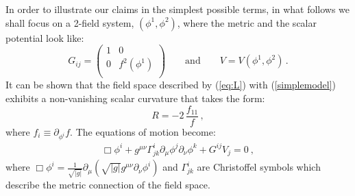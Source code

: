 \documentclass[a4paper,11pt]{article}
\def\be{\begin{equation}}
\def\ee{\end{equation}}
\begin{document}
In order to illustrate our claims in the simplest possible terms, in what follows we shall focus on a 2-field system, $(\phi^1,\phi^2)$, where the metric and the scalar potential look like:
\be
G_{ij}= \left(
  \begin{array}{cc}
   1 & 0  \\
0 & f^2(\phi^1) \\
  \end{array} \right)\qquad \text{and} \qquad V = V(\phi^1,\phi^2) \,.
	\label{simplemodel}
\ee
It can be shown that the field space described by (\ref{eq:L}) with (\ref{simplemodel}) exhibits a non-vanishing scalar curvature that takes the form:
\be
R=-2 \,\frac{f_{11}}{f}\,,
\label{eq:R}
\ee
where $f_i\equiv \partial_{\phi^i} f$. The equations of motion become:
\be
\begin{array}{ll}
\Box\phi^i +g^{\mu\nu}\Gamma_{jk}^i\partial_\mu{\phi}^j\partial_\nu\phi^k+G^{ij} V_j=0\ ,
\end{array}
\ee
where $\Box \phi^i=\frac{1}{\sqrt{|g|}}\partial_\mu\left(\sqrt{|g|}g^{\mu\nu }\partial_\nu\phi^i\right)$ and $\Gamma^i_{jk}$ are Christoffel symbols which describe the metric connection of the field space. 
\end{document}
